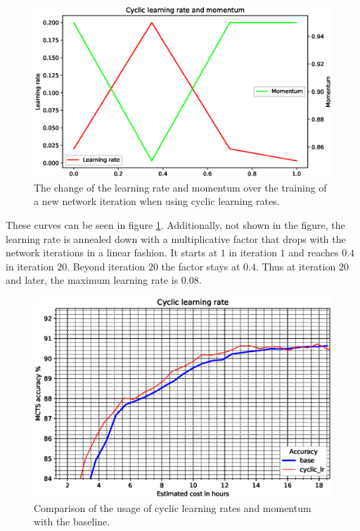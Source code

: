 \documentclass[12pt,onecolumn,oneside,titlepage]{article}
\begin{document}
\begin{figure}[H]
\centering
\includegraphics[clip,width=\columnwidth]{cyclic}
\caption{The change of the learning rate and momentum over the training of a new network iteration when using cyclic learning rates.}
\label{fig:cyclic_lr}
\end{figure}

These curves can be seen in figure \ref{fig:cyclic_lr}.
Additionally, not shown in the figure, the learning rate is annealed down with a multiplicative factor that drops with the network iterations in a linear fashion. It starts at $1$ in iteration $1$ and reaches $0.4$ in iteration $20$. Beyond iteration $20$ the factor stays at $0.4$.
Thus at iteration $20$ and later, the maximum learning rate is $0.08$.

\begin{figure}[H]
\centering
\includegraphics[clip,width=\columnwidth]{cyclic_results}
\caption{Comparison of the usage of cyclic learning rates and momentum with the baseline.}
\label{fig:cyclic_results}
\end{figure}
\end{document}
